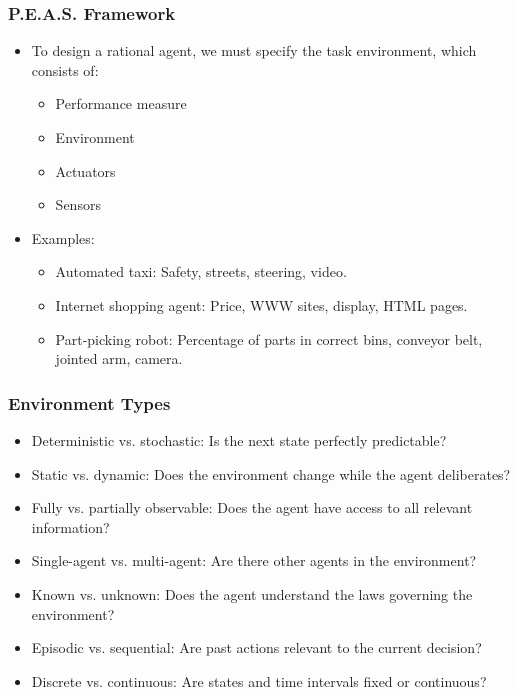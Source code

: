 \documentclass[8pt]{article}
\begin{document}
\subsubsection*{P.E.A.S. Framework}
\begin{itemize}
    \item To design a rational agent, we must specify the task environment, which consists of:
    \begin{itemize}
        \item Performance measure
        \item Environment
        \item Actuators
        \item Sensors
    \end{itemize}
    \item Examples:
    \begin{itemize}
        \item Automated taxi: Safety, streets, steering, video.
        \item Internet shopping agent: Price, WWW sites, display, HTML pages.
        \item Part-picking robot: Percentage of parts in correct bins, conveyor belt, jointed arm, camera.
    \end{itemize}
\end{itemize}

\subsubsection*{Environment Types}
\begin{itemize}
    \item Deterministic vs. stochastic: Is the next state perfectly predictable?
    \item Static vs. dynamic: Does the environment change while the agent deliberates?
    \item Fully vs. partially observable: Does the agent have access to all relevant information?
    \item Single-agent vs. multi-agent: Are there other agents in the environment?
    \item Known vs. unknown: Does the agent understand the laws governing the environment?
    \item Episodic vs. sequential: Are past actions relevant to the current decision?
    \item Discrete vs. continuous: Are states and time intervals fixed or continuous?
\end{itemize}
\end{document}
